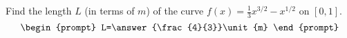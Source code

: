 \documentclass{ximera}
\author{Gregory Hartman \and Matthew Carr}
\begin{document}
\begin{exercise}





Find the length $L$ (in terms of $\unit{m}$) of the curve $f(x)=\frac{1}{3}x^{3/2}-x^{1/2}$ on $[0,1]$.
\[
\begin{prompt}
L=\answer{\frac{4}{3}}\unit{m}
\end{prompt}
\]




\end{exercise}
\end{document}
